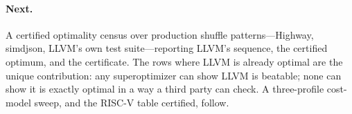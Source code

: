 \paragraph{Next.} A certified optimality census over production shuffle patterns---Highway, simdjson, LLVM's own test suite---reporting LLVM's sequence, the certified optimum, and the certificate. The rows where LLVM is already optimal are the unique contribution: any superoptimizer can show LLVM is beatable; none can show it is exactly optimal in a way a third party can check. A three-profile cost-model sweep, and the RISC-V table certified, follow.
